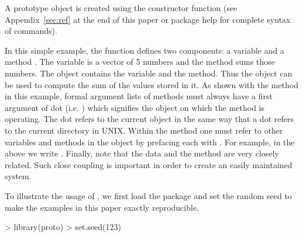 \documentclass{Z}
\begin{document}
A prototype object is created using the constructor function
 (see Appendix~\ref{sec:ref} at the end of this paper or
 package help for complete syntax of commands).  


In this simple example, the  function defines two
components: a variable  and a method .  The variable
 is a vector of 5 numbers and the method sums those numbers.
The  object  contains the variable and the
method.  Thus the   object can be used to compute
the sum of the values stored in it.
As shown with the  method in this example, formal argument
lists of methods must always have a first argument of dot
(i.e. )  which signifies the object on which the method is
operating.  The dot refers to the current object in the same way that
a dot refers to the current directory in UNIX.  Within the method one
must refer to other variables and methods in the object by prefacing
each with .  For example, in the above we write
.  Finally, note that the data and the method are very
closely related.  Such close coupling is important in order to create
an easily maintained system.

To illustrate the usage of , we first load the package and
set the random seed to make the examples in this paper exactly
reproducible.

\begin{Schunk}
\begin{Sinput}
> library(proto)
> set.seed(123)
\end{Sinput}
\end{Schunk}
\end{document}
